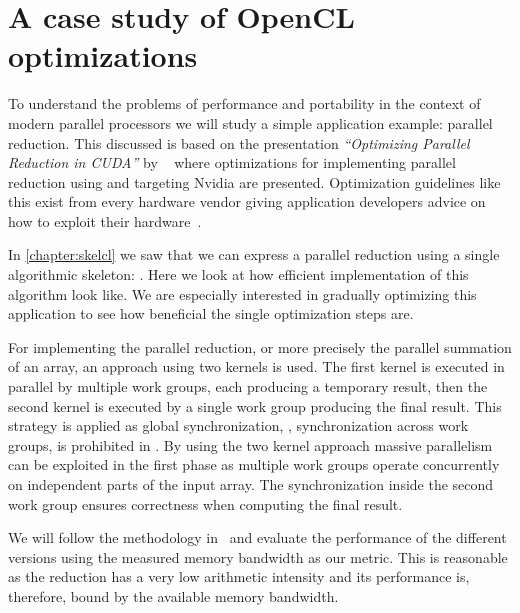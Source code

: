 \section{A case study of OpenCL optimizations}
To understand the problems of performance and portability in the context of modern parallel processors we will study a simple application example: parallel reduction.
This discussed is based on the presentation \emph{``Optimizing Parallel Reduction in CUDA''} by \citeauthor{Harris2007}~\cite{Harris2007} where optimizations for implementing parallel reduction using \CUDA and targeting Nvidia \GPUs are presented.
Optimization guidelines like this exist from every hardware vendor giving application developers advice on how to exploit their hardware~\cite{CUDAProgrammingGuide,AMDProgrammingGuide,IntelGPUProgrammingGuide,IntelXeonProgrammingGuide}.

In \autoref{chapter:skelcl} we saw that we can express a parallel reduction using a single algorithmic skeleton: \reduce.
Here we look at how efficient \OpenCL implementation of this algorithm look like.
We are especially interested in gradually optimizing this application to see how beneficial the single optimization steps are.

For implementing the parallel reduction, or more precisely the parallel summation of an array, an approach using two \OpenCL kernels is used.
The first \OpenCL kernel is executed in parallel by multiple \OpenCL work groups, each producing a temporary result, then the second \OpenCL kernel is executed by a single \OpenCL work group producing the final result.
This strategy is applied as global synchronization, \ie, synchronization across work groups, is prohibited in \OpenCL.
By using the two kernel approach massive parallelism can be exploited in the first phase as multiple work groups operate concurrently on independent parts of the input array.
The synchronization inside the second work group ensures correctness when computing the final result.

We will follow the methodology in~\cite{Harris2007} and evaluate the performance of the different versions using the measured memory bandwidth as our metric.
This is reasonable as the reduction has a very low arithmetic intensity and its performance is, therefore, bound by the available memory bandwidth.


